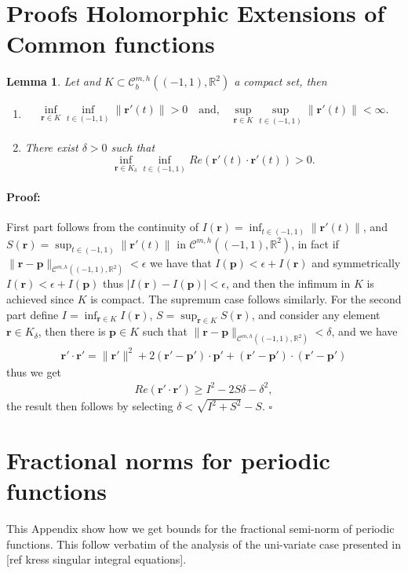\documentclass{article}
\newtheorem{lemma}[theorem]{Lemma}
\newenvironment{proof}{\paragraph{Proof:}}{\hfill$\square$}
\newcommand{\todo}[1]{{\color{red}[#1]}}
\newcommand{\IR}{{\mathbb R}}
\newcommand{\bp}{{\bm p}}
\newcommand{\cmspaceh}[4]{\mathcal{C}^{#1,#2} \left( #3, #4 \right)}
\newcommand{\rgeoh}[2]{\mathcal{C}_b^{#1,#2}\left( (-1,1), \IR^2 \right)}
\newcommand{\br}{\bm{r}}
\begin{document}
\section{Proofs Holomorphic Extensions of Common functions }
\label{appendix:funext}
\begin{lemma}
\label{lemma:dwelldef}
Let and $K \subset \rgeoh{m}{h}$ a compact set, then 
\begin{enumerate}
\item 
\begin{align*}
\inf_{\br \in K } \inf_{t \in (-1,1)} \| \br'(t) \|>0  \quad \text{and,} \quad  \sup_{\br \in K} \sup_{t \in (-1,1)} \| \br'(t)\| < \infty.
\end{align*}
\item 
There exist $\delta >0 $ such that  
$$ 
\inf_{\br \in K_\delta} \inf_{t \in (-1,1)}Re (\br'(t) \cdot \br'(t)) > 0 .$$
\end{enumerate}
\end{lemma}
\begin{proof}
First part follows from the continuity of $I(\br) = \inf_{t \in (-1,1)} \| \br'(t)\|$, and $S(\br) = \sup_{t \in (-1,1)} \| \br'(t)\|$ in $\cmspaceh{m}{h}{(-1,1)}{\IR^2}$, in fact if $\| \br -\bp \|_{\cmspaceh{m}{h}{(-1,1)}{\IR^2}}< \epsilon$ we have that 
$I(\bp)  < \epsilon + I(\br)$
and symmetrically 
$
I(\br)  < \epsilon + I(\bp)
$
thus $|I(\br) - I(\bp)| < \epsilon$, and then the infimum in $K$ is achieved since $K$ is compact. The supremum case follows similarly. For the second part define $I = \inf_{\br \in K } I(\br)$, $S =\sup_{\br \in K } S(\br)$, and consider any element $\br \in K_\delta$, then there is $\bp \in K$ such that $\| \br -\bp \|_{\cmspaceh{m}{h}{(-1,1)}{\IR^2}} < \delta$, and we have 
\begin{align*}
\br' \cdot \br' = \|\br'\|^2+ 2(\br' -\bp')\cdot \bp' +(\br'-\bp')\cdot(\br'-\bp') 
\end{align*}
thus we get
\begin{align*}
Re(\br' \cdot \br') \geq I^2 - 2S\delta -\delta^2, \end{align*}
the result then follows by selecting $\delta < \sqrt{I^2+S^2}-S$.
\end{proof} 
\section{Fractional norms for periodic functions}
\label{appendix:fracbivariate}
This Appendix show how we get bounds for the fractional semi-norm of periodic functions. This follow verbatim of the analysis of the uni-variate case presented in \todo{ref kress singular integral equations}. 
\end{document}
